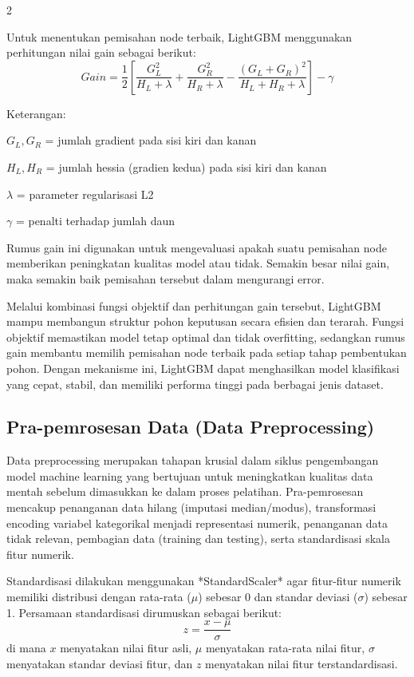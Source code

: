 \documentclass[12pt, a4paper, onecolumn, oneside]{report}
\begin{document}
\begin{spacing}{2}
\begin{enumerate}
    Untuk menentukan pemisahan node terbaik, LightGBM menggunakan perhitungan nilai gain sebagai berikut:
    \begin{equation}
        Gain = \frac{1}{2} \left[ \frac{G_L^2}{H_L + \lambda} + \frac{G_R^2}{H_R + \lambda} - \frac{(G_L + G_R)^2}{H_L + H_R + \lambda} \right] - \gamma
    \end{equation}
    
    Keterangan:
    
    $G_L, G_R$ = jumlah gradient pada sisi kiri dan kanan
    
    $H_L, H_R$ = jumlah hessia (gradien kedua) pada sisi kiri dan kanan
    
    $\lambda$ = parameter regularisasi L2
    
    $\gamma$ = penalti terhadap jumlah daun
    
    Rumus gain ini digunakan untuk mengevaluasi apakah suatu pemisahan node memberikan peningkatan kualitas model atau tidak. Semakin besar nilai gain, maka semakin baik pemisahan tersebut dalam mengurangi error.
\end{enumerate}

Melalui kombinasi fungsi objektif dan perhitungan gain tersebut, LightGBM mampu membangun struktur pohon keputusan secara efisien dan terarah. Fungsi objektif memastikan model tetap optimal dan tidak overfitting, sedangkan rumus gain membantu memilih pemisahan node terbaik pada setiap tahap pembentukan pohon. Dengan mekanisme ini, LightGBM dapat menghasilkan model klasifikasi yang cepat, stabil, dan memiliki performa tinggi pada berbagai jenis dataset.

\subsection{Pra-pemrosesan Data (Data Preprocessing)}
Data preprocessing merupakan tahapan krusial dalam siklus pengembangan model machine learning yang bertujuan untuk meningkatkan kualitas data mentah sebelum dimasukkan ke dalam proses pelatihan. Pra-pemrosesan mencakup penanganan data hilang (imputasi median/modus), transformasi encoding variabel kategorikal menjadi representasi numerik, penanganan data tidak relevan, pembagian data (training dan testing), serta standardisasi skala fitur numerik.

Standardisasi dilakukan menggunakan *StandardScaler* agar fitur-fitur numerik memiliki distribusi dengan rata-rata ($\mu$) sebesar 0 dan standar deviasi ($\sigma$) sebesar 1. Persamaan standardisasi dirumuskan sebagai berikut:
\begin{equation}
    z = \frac{x - \mu}{\sigma}
\end{equation}
di mana $x$ menyatakan nilai fitur asli, $\mu$ menyatakan rata-rata nilai fitur, $\sigma$ menyatakan standar deviasi fitur, dan $z$ menyatakan nilai fitur terstandardisasi.


\end{spacing}
\end{document}
